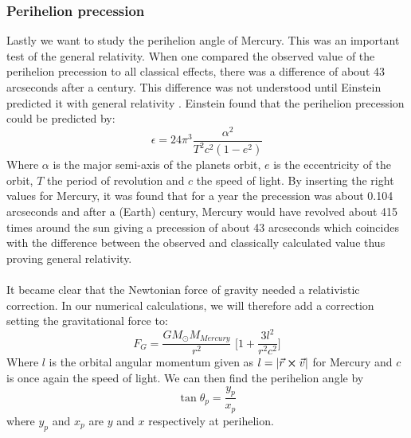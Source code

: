 \documentclass{article}
\newcommand{\TomH}[1]{\Big[ #1 \Big]}
\begin{document}
\subsubsection{Perihelion precession}
Lastly we want to study the perihelion angle of Mercury. This was an important test of the general relativity. When one compared the observed value of the perihelion precession to all classical effects, there was a difference of about 43 arcseconds after a century. This difference was not understood until Einstein predicted it with general relativity \cite{Perihelion}. Einstein found that the perihelion precession could be predicted by:
\begin{equation}
\epsilon = 24 \pi^3 \frac{\alpha^2}{T^2 c^2 (1 - e^2)}
\label{eq:perihelion}
\end{equation}
Where $\alpha$ is the major semi-axis of the planets orbit, $e$ is the eccentricity of the orbit, $T$ the period of revolution and $c$ the speed of light. By inserting the right values for Mercury, it was found that for a year the precession was about 0.104 arcseconds and after a (Earth) century, Mercury would have revolved about 415 times around the sun giving a precession of about 43 arcseconds which coincides with the difference between the observed and classically calculated value thus proving general relativity. \\\\
It became clear that the Newtonian force of gravity needed a relativistic correction. In our numerical calculations, we will therefore add a correction setting the gravitational force to:
\begin{equation}
F_G = \frac{G M_{\odot} M_{Mercury}}{r^2} \, \, \TomH{1 + \frac{3l^2}{r^2c^2}}
\label{eq:FgGR}
\end{equation}
Where $l$ is the orbital angular momentum given as $l = |\vec{r} \cross \vec{v}|$ for Mercury and $c$ is once again the speed of light.
We can then find the perihelion angle by
\begin{equation}
\tan \theta_p = \frac{y_p}{x_p}
\end{equation}
where $y_p$ and $x_p$ are $y$ and $x$ respectively at perihelion.
\end{document}
